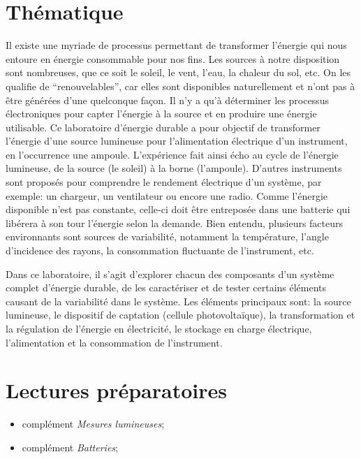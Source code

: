 \documentclass[canadien,12pt,oneside,letterpaper]{article}
\begin{document}
\section{Thématique}\label{sec:thematique}
\vspace{-2ex}
Il existe une myriade de processus permettant de transformer l’énergie qui nous entoure en énergie consommable pour nos fins. Les sources à notre disposition sont nombreuses, que ce soit le soleil, le vent, l’eau, la chaleur du sol, etc. On les qualifie de “renouvelables”, car elles sont disponibles naturellement et n’ont pas à être générées d’une quelconque façon. Il n’y a qu’à déterminer les processus électroniques pour capter l'énergie à la source et en produire une énergie utilisable. Ce laboratoire d'énergie durable a pour objectif de transformer l'énergie d'une source lumineuse pour l'alimentation électrique d'un instrument, en l'occurrence une ampoule. L'expérience fait ainsi écho au cycle de l'énergie lumineuse, de la source (le soleil) à la borne (l'ampoule). D'autres instruments sont proposés pour comprendre le rendement électrique d'un système, par exemple: un chargeur, un ventilateur ou encore une radio. Comme l'énergie disponible n'est pas constante, celle-ci doit être entreposée dans une batterie qui libérera à son tour l'énergie selon la demande. Bien entendu, plusieurs facteurs environnants sont sources de variabilité, notamment la température, l'angle d'incidence des rayons, la consommation fluctuante de l'instrument, etc.

Dans ce laboratoire, il s'agit d'explorer chacun des composants d'un système complet d'énergie durable, de les caractériser et de tester certains éléments causant de la variabilité dans le système. Les éléments principaux sont: la source lumineuse, le dispositif de captation (cellule photovoltaïque), la transformation et la régulation de l'énergie en électricité, le stockage en charge électrique, l'alimentation et la consommation de l'instrument.

\section{Lectures préparatoires}\label{sec:lectures preparatoires}
\vspace{-2ex}
\begin{itemize}
\item complément \textit{Mesures lumineuses};
\item complément \textit{Batteries};
\end{itemize}
\end{document}
